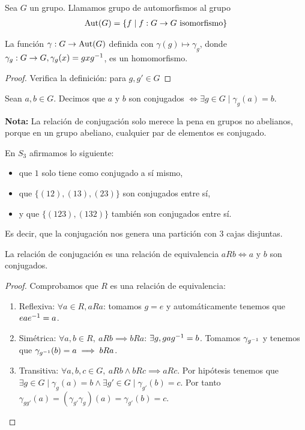 \begin{dfn}
	Sea $G$ un grupo. Llamamos grupo de automorfismos al grupo
	\begin{align}
	\text{Aut}(G) = \{f \mid f: G \to G \text{ isomorfismo}\}
	\end{align}
\end{dfn}

\begin{pro}
	La función $\gamma: G \to \text{Aut}(G)$ definida con $\gamma(g) \mapsto \gamma_g$, donde $\gamma_g : G \to G, \gamma_g(x) = gxg^{-1}$, es un homomorfismo.
\end{pro}

\begin{proof}
	Verifica la definición: para $g,g' \in G$
\end{proof}

\begin{dfn}
	\label{dfn:elementosconjugados}
	Sean $a,b \in G$. Decimos que $a$ y $b$ son conjugados $\iff \exists g \in G \mid \gamma_g(a) = b$.
\end{dfn}

\textbf{Nota:} La relación de conjugación solo merece la pena en grupos no abelianos, porque en un grupo abeliano, cualquier par de elementos es conjugado.

\begin{ej}
	En $S_3$ afirmamos lo siguiente:
	\begin{itemize}
		\item que $1$ solo tiene como conjugado a sí mismo,
		\item que $\{(12),(13),(23)\}$ son conjugados entre sí,
		\item y que $\{(123),(132)\}$ también son conjugados entre sí.
	\end{itemize}
	Es decir, que la conjugación nos genera una partición con 3 cajas disjuntas.
\end{ej}

\begin{pro}
	La relación de conjugación es una relación de equivalencia $aRb \iff a$ y $b$ son conjugados.
\end{pro}

\begin{proof}
	Comprobamos que $R$ es una relación de equivalencia:
	\begin{enumerate}
		\item Reflexiva: $\forall a \in R, aRa$: tomamos $g = e$ y automáticamente tenemos que $eae^{-1} = a$.
		\item Simétrica: $\forall a,b \in R,\ aRb \implies bRa$: $\exists g, g a g^{-1} = b$. Tomamos $\gamma_{g^{-1}}$ y tenemos que $\gamma_{g^{-1}}(b) = a \implies bRa$.
		\item Transitiva: $\forall a,b,c \in G,\ aRb \land bRc \implies aRc$. Por hipótesis tenemos que $\exists g \in G \mid \gamma_g(a) = b \land \exists g' \in G \mid \gamma_{g'}(b) = c$. Por tanto $\gamma_{gg'}(a) = (\gamma_{g'} \gamma_g)(a) = \gamma_{g'}(b) = c$.
	\end{enumerate}
\end{proof}



